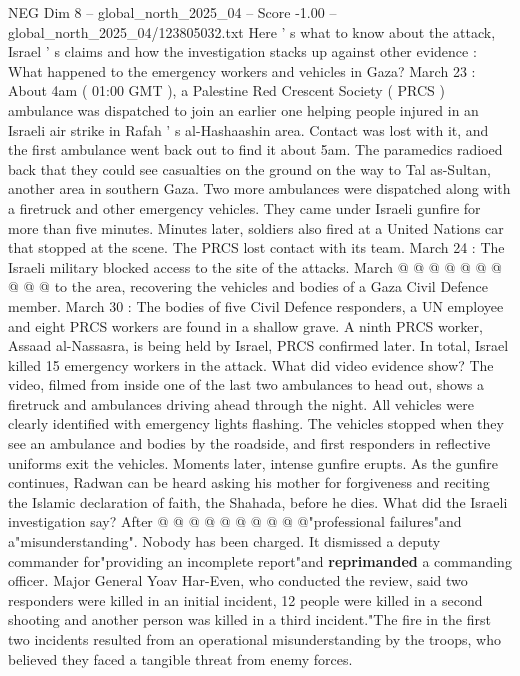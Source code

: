 \begin{textsample}{NEG Dim 8 – global\_north\_2025\_04 – Score -1.00 – global\_north\_2025\_04/123805032.txt}  \label{ex:f8_neg_421}
Here ' s what to know about the attack, Israel ' s claims and how the investigation stacks up against other evidence : What happened to the emergency workers and vehicles in Gaza?
March 23 : About 4am ( 01:00 GMT ), a Palestine Red Crescent Society ( PRCS ) ambulance was dispatched to join an earlier one helping people injured in an Israeli air strike in Rafah ' s al-Hashaashin area.
Contact was lost with it, and the first ambulance went back out to find it about 5am.
The paramedics radioed back that they could see casualties on the ground on the way to Tal as-Sultan, another area in southern Gaza.
Two more ambulances were dispatched along with a firetruck and other emergency vehicles.
They came under Israeli gunfire for more than five minutes.
Minutes later, soldiers also fired at a United Nations car that stopped at the scene.
The PRCS lost contact with its team.
March 24 : The Israeli military blocked access to the site of the attacks.
March @ @ @ @ @ @ @ @ @ @ to the area, recovering the vehicles and bodies of a Gaza Civil Defence member.
March 30 : The bodies of five Civil Defence responders, a UN employee and eight PRCS workers are found in a shallow grave.
A ninth PRCS worker, Assaad al-Nassasra, is being held by Israel, PRCS confirmed later.
In total, Israel killed 15 emergency workers in the attack.
What did video evidence show?
The video, filmed from inside one of the last two ambulances to head out, shows a firetruck and ambulances driving ahead through the night.
All vehicles were clearly identified with emergency lights flashing.
The vehicles stopped when they see an ambulance and bodies by the roadside, and first responders in reflective uniforms exit the vehicles.
Moments later, intense gunfire erupts.
As the gunfire continues, Radwan can be heard asking his mother for forgiveness and reciting the Islamic declaration of faith, the Shahada, before he dies.
What did the Israeli investigation say?
After @ @ @ @ @ @ @ @ @ @"professional failures"and a"misunderstanding".
Nobody has been charged.
It dismissed a deputy commander for"providing an incomplete report"and \textbf{reprimanded} a commanding officer.
Major General Yoav Har-Even, who conducted the review, said two responders were killed in an initial incident, 12 people were killed in a second shooting and another person was killed in a third incident."The fire in the first two incidents resulted from an operational misunderstanding by the troops, who believed they faced a tangible threat from enemy forces.

\end{textsample}
